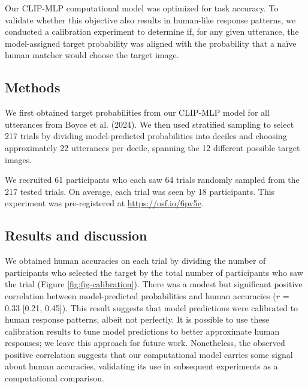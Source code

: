 \documentclass[10pt, letterpaper]{article}
\begin{document}
Our CLIP-MLP computational model was optimized for task accuracy. To
validate whether this objective also results in human-like response
patterns, we conducted a calibration experiment to determine if, for any
given utterance, the model-assigned target probability was aligned with
the probability that a naïve human matcher would choose the target
image.

\subsection{Methods}\label{methods}

We first obtained target probabilities from our CLIP-MLP model for all
utterances from Boyce et al. (2024). We then used stratified sampling to
select 217 trials by dividing model-predicted probabilities into deciles
and choosing approximately 22 utterances per decile, spanning the 12
different possible target images.

We recruited 61 participants who each saw 64 trials randomly sampled
from the 217 tested trials. On average, each trial was seen by 18
participants. This experiment was pre-registered at
\url{https://osf.io/6pv5e}.

\subsection{Results and discussion}\label{results-and-discussion}

We obtained human accuracies on each trial by dividing the number of
participants who selected the target by the total number of participants
who saw the trial (Figure \ref{fig:fig-calibration}). There was a modest
but significant positive correlation between model-predicted
probabilities and human accuracies (\(r\) = 0.33 {[}0.21, 0.45{]}). This
result suggests that model predictions were calibrated to human response
patterns, albeit not perfectly. It is possible to use these calibration
results to tune model predictions to better approximate human responses;
we leave this approach for future work. Nonetheless, the observed
positive correlation suggests that our computational model carries some
signal about human accuracies, validating its use in subsequent
experiments as a computational comparison.
\end{document}
